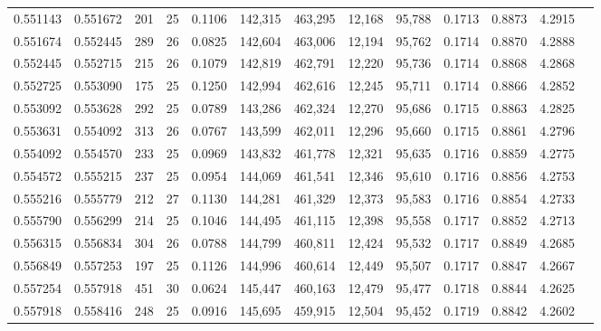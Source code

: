 \begin{tabular}{rrrrrrrrrrrrr}
0.551143 & 0.551672 &   201 &  25 &                                     0.1106 & 142,315 & 463,295 &  12,168 &  95,788 & 0.1713 & 0.8873 & 4.2915 \\
0.551674 & 0.552445 &   289 &  26 &                                     0.0825 & 142,604 & 463,006 &  12,194 &  95,762 & 0.1714 & 0.8870 & 4.2888 \\
0.552445 & 0.552715 &   215 &  26 &                                     0.1079 & 142,819 & 462,791 &  12,220 &  95,736 & 0.1714 & 0.8868 & 4.2868 \\
0.552725 & 0.553090 &   175 &  25 &                                     0.1250 & 142,994 & 462,616 &  12,245 &  95,711 & 0.1714 & 0.8866 & 4.2852 \\
0.553092 & 0.553628 &   292 &  25 &                                     0.0789 & 143,286 & 462,324 &  12,270 &  95,686 & 0.1715 & 0.8863 & 4.2825 \\
0.553631 & 0.554092 &   313 &  26 &                                     0.0767 & 143,599 & 462,011 &  12,296 &  95,660 & 0.1715 & 0.8861 & 4.2796 \\
0.554092 & 0.554570 &   233 &  25 &                                     0.0969 & 143,832 & 461,778 &  12,321 &  95,635 & 0.1716 & 0.8859 & 4.2775 \\
0.554572 & 0.555215 &   237 &  25 &                                     0.0954 & 144,069 & 461,541 &  12,346 &  95,610 & 0.1716 & 0.8856 & 4.2753 \\
0.555216 & 0.555779 &   212 &  27 &                                     0.1130 & 144,281 & 461,329 &  12,373 &  95,583 & 0.1716 & 0.8854 & 4.2733 \\
0.555790 & 0.556299 &   214 &  25 &                                     0.1046 & 144,495 & 461,115 &  12,398 &  95,558 & 0.1717 & 0.8852 & 4.2713 \\
0.556315 & 0.556834 &   304 &  26 &                                     0.0788 & 144,799 & 460,811 &  12,424 &  95,532 & 0.1717 & 0.8849 & 4.2685 \\
0.556849 & 0.557253 &   197 &  25 &                                     0.1126 & 144,996 & 460,614 &  12,449 &  95,507 & 0.1717 & 0.8847 & 4.2667 \\
0.557254 & 0.557918 &   451 &  30 &                                     0.0624 & 145,447 & 460,163 &  12,479 &  95,477 & 0.1718 & 0.8844 & 4.2625 \\
0.557918 & 0.558416 &   248 &  25 &                                     0.0916 & 145,695 & 459,915 &  12,504 &  95,452 & 0.1719 & 0.8842 & 4.2602 \\

\end{tabular}
